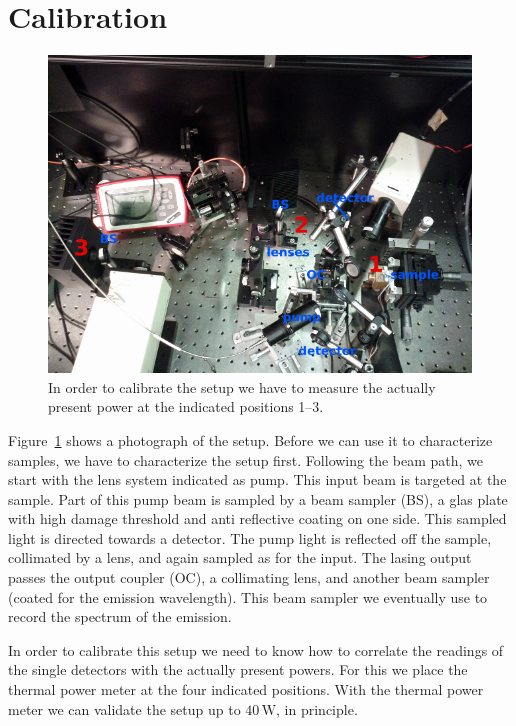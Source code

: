 \section{Calibration}
\label{sec:calib}

\begin{figure}
\centering
\includegraphics[width=12.5cm]{img/calib_setup.png}
\caption{In order to calibrate the setup we have to
measure the actually present power at the indicated positions 1--3.}
\label{img:calib_setup}
\end{figure}

Figure~\ref{img:calib_setup} shows a photograph of the setup.
Before we can use it to characterize samples,
we have to characterize the setup first.
Following the beam path,
we start with the lens system indicated as pump.
This input beam is targeted at the sample.
Part of this pump beam is sampled by a beam sampler (BS),
a glas plate with high damage threshold and
anti reflective coating on one side.
This sampled light is directed towards a detector.
The pump light is reflected off the sample,
collimated by a lens,
and again sampled as for the input.
The lasing output passes the output coupler (OC),
a collimating lens,
and another beam sampler (coated for the emission wavelength).
This beam sampler we eventually use to record the spectrum of the emission.

In order to calibrate this setup we need to know
how to correlate the readings of the single detectors
with the actually present powers.
For this we place the thermal power meter at
the four indicated positions.
With the thermal power meter we can validate
the setup up to $40\,\mathrm{W}$, in principle.

